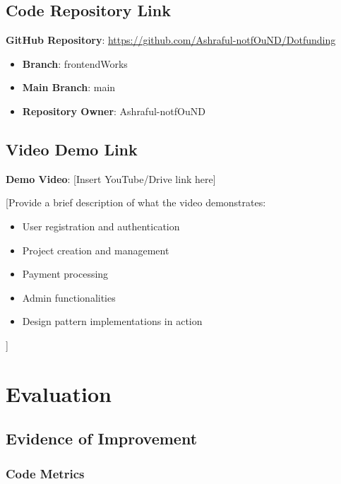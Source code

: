 \documentclass[a4paper,12pt]{report}
\begin{document}
\section{Code Repository Link}

\textbf{GitHub Repository}: \href{https://github.com/Ashraful-notfOuND/Dotfunding}{https://github.com/Ashraful-notfOuND/Dotfunding}

\begin{itemize}
    \item \textbf{Branch}: frontendWorks
    \item \textbf{Main Branch}: main
    \item \textbf{Repository Owner}: Ashraful-notfOuND
\end{itemize}

\section{Video Demo Link}

\textbf{Demo Video}: [Insert YouTube/Drive link here]

[Provide a brief description of what the video demonstrates:
\begin{itemize}
    \item User registration and authentication
    \item Project creation and management
    \item Payment processing
    \item Admin functionalities
    \item Design pattern implementations in action
\end{itemize}]

\chapter{Evaluation}

\section{Evidence of Improvement}

\subsection{Code Metrics}
\end{document}
